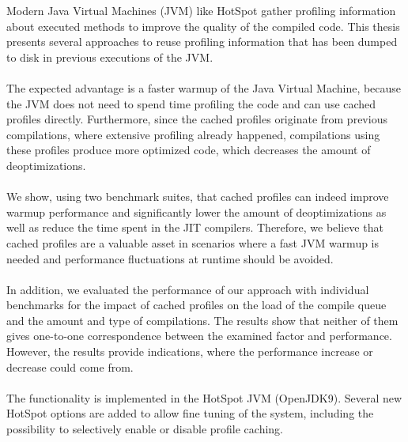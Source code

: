 Modern Java Virtual Machines (JVM) like HotSpot gather profiling information about executed methods to improve the quality of the compiled code.
This thesis presents several approaches to reuse profiling information that has been dumped to disk in previous executions of the JVM.
\\\\
The expected advantage is a faster warmup of the Java Virtual Machine, because the JVM does not need to spend time profiling the code and can use cached profiles directly.
Furthermore, since the cached profiles originate from previous compilations, where extensive profiling already happened, compilations using these profiles produce more optimized code, which decreases the amount of deoptimizations.
\\\\
We show, using two benchmark suites, that cached profiles can indeed improve warmup performance and significantly lower the amount of deoptimizations as well as reduce the time spent in the JIT compilers.
Therefore, we believe that cached profiles are a valuable asset in scenarios where a fast JVM warmup is needed and performance fluctuations at runtime should be avoided.
\\\\
In addition, we evaluated the performance of our approach with individual benchmarks for the impact of cached profiles on the load of the compile queue and the amount and type of compilations. The results show that neither of them gives one-to-one correspondence between the examined factor and performance. However, the results provide indications, where the performance increase or decrease could come from.
\\\\
The functionality is implemented in the HotSpot JVM (OpenJDK9). Several new HotSpot options are added to allow fine tuning of the system, including the possibility to selectively enable or disable profile caching.
